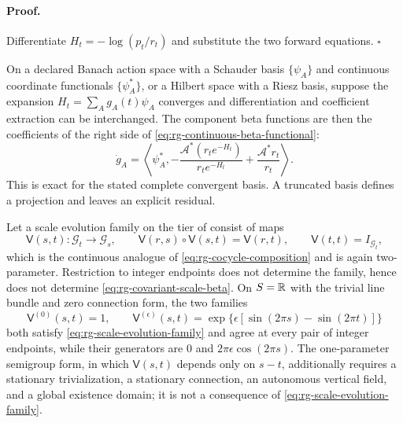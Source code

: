 \paragraph{Proof.}
Differentiate $H_t=-\log(p_t/r_t)$ and substitute the two forward equations.
$\square$

On a declared Banach action space with a Schauder basis
$\{\psi_A\}$ and continuous coordinate functionals
$\{\psi_A^*\}$, or a Hilbert space with a Riesz basis, suppose the expansion
$H_t=\sum_Ag_A(t)\psi_A$ converges and differentiation and coefficient
extraction can be interchanged.  The component beta functions are then the
coefficients of the right side of \eqref{eq:rg-continuous-beta-functional}:
\begin{equation}
\dot g_A=\left\langle\psi_A^*,
-\frac{\mathcal A^*(r_te^{-H_t})}{r_te^{-H_t}}
+\frac{\mathcal A^*r_t}{r_t}\right\rangle.
\label{eq:rg-component-beta}
\end{equation}
This is exact for the stated complete convergent basis.  A truncated basis
defines a projection and leaves an explicit residual.  

Let a scale evolution family on the tier of
 consist of maps
\begin{equation}
\mathsf V(s,t):\mathscr G_t\longrightarrow\mathscr G_s,
\qquad
\mathsf V(r,s)\circ\mathsf V(s,t)=\mathsf V(r,t),
\qquad
\mathsf V(t,t)=I_{\mathscr G_t},
\label{eq:rg-scale-evolution-family}
\end{equation}
which is the continuous analogue of \eqref{eq:rg-cocycle-composition} and is
again two-parameter.  Restriction to integer endpoints does not determine the
family, hence does not determine
\eqref{eq:rg-covariant-scale-beta}.  On $S=\mathbb R$ with the trivial line bundle and
zero connection form, the two families
\begin{equation}
\mathsf V^{(0)}(s,t)=1,
\qquad
\mathsf V^{(\epsilon)}(s,t)
=\exp\bigl\{\epsilon[\sin(2\pi s)-\sin(2\pi t)]\bigr\}
\label{eq:rg-scale-interpolation-witness}
\end{equation}
both satisfy \eqref{eq:rg-scale-evolution-family} and agree at every pair of
integer endpoints, while their generators are $0$ and
$2\pi\epsilon\cos(2\pi s)$.  The one-parameter semigroup form, in which
$\mathsf V(s,t)$ depends only on $s-t$, additionally requires a stationary
trivialization, a stationary connection, an autonomous vertical field, and a
global existence domain; it is not a consequence of
\eqref{eq:rg-scale-evolution-family}. 

